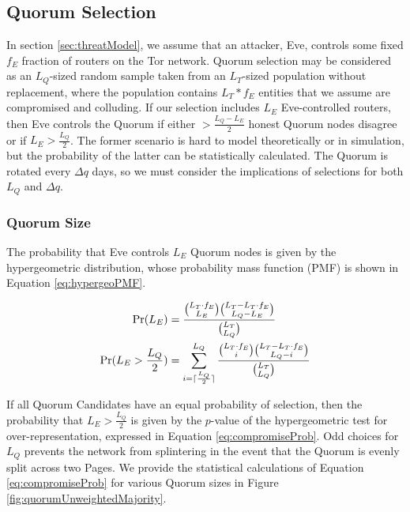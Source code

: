 \documentclass[conference]{IEEEtran}
\DeclarePairedDelimiter{\ceil}{\lceil}{\rceil}
\begin{document}
\subsection{Quorum Selection}
\label{sec:QSelection}

In section \ref{sec:threatModel}, we assume that an attacker, Eve, controls some fixed $ f_{E} $ fraction of routers on the Tor network. Quorum selection may be considered as an $ L_{Q} $-sized random sample taken from an $ L_{T} $-sized population without replacement, where the population contains $ L_{T} * f_{E} $ entities that we assume are compromised and colluding. If our selection includes $ L_{E} $ Eve-controlled routers, then Eve controls the Quorum if either $ > \frac{L_{Q} - L_{E}}{2} $ honest Quorum nodes disagree or if $ L_{E} > \frac{L_{Q}}{2} $. The former scenario is hard to model theoretically or in simulation, but the probability of the latter can be statistically calculated. The Quorum is rotated every $ \Delta q $ days, so we must consider the implications of selections for both $ L_{Q} $ and $ \Delta q $.

\subsubsection{Quorum Size}
\label{sec:qSize}

The probability that Eve controls $ L_{E} $ Quorum nodes is given by the hypergeometric distribution, whose probability mass function (PMF) is shown in Equation \ref{eq:hypergeoPMF}.

\begin{align}
	\mathrm{Pr}(L_{E}) &= \frac{\binom{L_{T} \cdot f_{E}}{L_{E}}\binom{L_{T} - L_{T} \cdot f_{E}}{L_{Q} - L_{E}}}{\binom{L_{T}}{L_{Q}}}
	\label{eq:hypergeoPMF}
	\\
	\mathrm{Pr}(L_{E} > \frac{L_{Q}}{2}) &= \displaystyle\sum_{i=\ceil{\frac{L_{Q}}{2}}}^{L_{Q}} \frac{\binom{L_{T} \cdot f_{E}}{i}\binom{L_{T} - L_{T} \cdot f_{E}}{L_{Q} - i}}{\binom{L_{T}}{L_{Q}}}
	\label{eq:compromiseProb}
\end{align}

If all Quorum Candidates have an equal probability of selection, then the probability that $ L_{E} > \frac{L_{Q}}{2} $ is given by the $p$-value of the hypergeometric test for over-representation, expressed in Equation \ref{eq:compromiseProb}. Odd choices for $ L_{Q} $ prevents the network from splintering in the event that the Quorum is evenly split across two Pages. We provide the statistical calculations of Equation \ref{eq:compromiseProb} for various Quorum sizes in Figure \ref{fig:quorumUnweightedMajority}.
\end{document}
